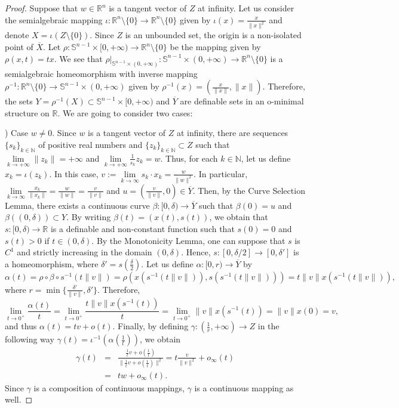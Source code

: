 \documentclass[10pt,a4paper]{amsart}
\newcommand{\N}{\mathbb N}
\newcommand{\R}{\mathbb R}
\begin{document}
\begin{proof}
Suppose that $w\in\R^n$ is a tangent vector of $Z$ at infinity. Let us consider the semialgebraic mapping $\iota\colon\R^n\setminus\{0\}\to \R^n\setminus\{0\}$ given by $\iota(x)=\frac{x}{\|x\|^2}$ and denote $X=\iota(Z\setminus \{0\})$.  Since $Z$ is an unbounded set, the origin is a non-isolated point of $\overline{X}$. Let $\rho\colon \mathbb{S}^{n-1}\times [0,+\infty )\to \R^n\setminus \{0\}$ be the mapping given by $\rho(x,t)=tx$. We see that $\rho|_{\mathbb{S}^{n-1}\times (0,+\infty )}:\mathbb{S}^{n-1}\times (0,+\infty )\to \R^n\setminus \{0\}$ is a semialgebraic homeomorphism with inverse mapping $\rho^{-1}\colon\R^n\setminus \{0\}\to \mathbb{S}^{n-1}\times (0,+\infty )$ given by $\rho^{-1}(x)=(\frac{x}{\|x\|},\|x\|)$. Therefore, the sets $Y=\rho^{-1}(X)\subset \mathbb{S}^{n-1}\times [0,+\infty )$ and $\overline{Y}$ are definable sets in an o-minimal structure on $\R$. We are going to consider two cases:

\bigskip

) Case $w\not=0$. Since $w$ is a tangent vector of $Z$ at infinity, there are sequences $\{s_k\}_{k\in \N}$ of positive real numbers and $\{z_k\}_{k\in \N}\subset Z$ such that $\lim\limits _{k\to +\infty }\|z_k\|=+\infty $ and $\lim\limits _{k\to +\infty }\frac{1}{s_k}z_k=w$. Thus, for each $k\in \N$, let us define $x_k=\iota(z_k)$. In this case,  $v:=\lim\limits _{k\to \infty } s_k\cdot x_k= \frac{w}{\|w\|^2}$. In particular, $\lim\limits _{k\to \infty } \frac{x_k}{\|x_k\|}=\frac{w}{\|w\|}=\frac{v}{\|v\|}$ and $u=(\frac{v}{\|v\|},0)\in \overline{Y}$. Then, by the Curve Selection Lemma, there exists a continuous curve $\beta:[0,\delta)\to \overline{Y}$ such that $\beta(0)=u$ and $\beta((0,\delta ))\subset Y$. By writing $\beta(t)=(x(t),s(t))$, we obtain that $s:[0,\delta )\to \R$ is a definable and non-constant function such that $s(0)=0$ and $s(t)>0$ if $t\in (0,\delta )$. By the Monotonicity Lemma, one can suppose that $s$ is $C^1$ and  strictly increasing in the domain $(0,\delta)$. Hence, $s\colon [0,\delta/2]\to [0,\delta' ]$ is a homeomorphism, where $\delta' =s(\frac{\delta}{2})$. Let us define $\alpha\colon [0,r)\to \overline{Y}$ by
$$
\alpha(t)=\rho\circ \beta\circ s^{-1}(t\|v\|)=\rho(x(s^{-1}(t\|v\|)),s(s^{-1}(t\|v\|)))=t\|v\|x(s^{-1}(t\|v\|)),
$$
where $r=\min\{\frac{\delta'}{\|v\|},\delta'\}$. Therefore,
$$
\lim\limits _{t\to 0^+}\frac{\alpha(t)}{t}=\lim\limits _{t\to 0^+}\frac{t\|v\|x(s^{-1}(t))}{t}=\lim\limits _{t\to 0^+}\|v\|x(s^{-1}(t))=\|v\|x(0)=v,
$$
and thus $\alpha(t)=tv+o(t)$. Finally, by defining $\gamma\colon(\frac{1}{r},+\infty )\to Z$ in the following way $\gamma(t)=\iota^{-1}(\alpha(\frac{1}{t}))$, we obtain
\begin{eqnarray*}
\gamma(t) &=& \frac{\frac{1}{t}v+o(\frac{1}{t})}{\|\frac{1}{t}v+o(\frac{1}{t})\|^2}=t\textstyle{\frac{v}{\|v\|^2}}+o_{\infty }(t)\\
		  &=& tw+o_{\infty }(t).
\end{eqnarray*}
Since $\gamma$ is a composition of continuous mappings,  $\gamma$ is a continuous mapping as well.


\end{proof}
\end{document}

